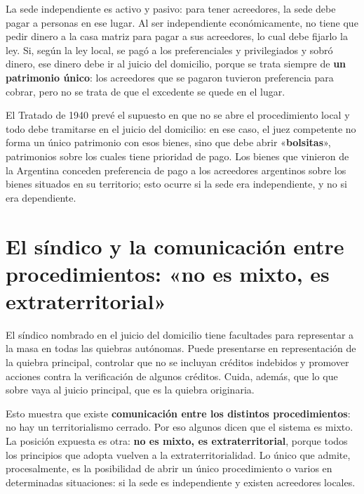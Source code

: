 \documentclass[12pt,oneside]{book}
\begin{document}
La sede independiente es activo y pasivo: para tener acreedores, la sede debe pagar a personas en ese lugar. Al ser independiente económicamente, no tiene que pedir dinero a la casa matriz para pagar a sus acreedores, lo cual debe fijarlo la ley. Si, según la ley local, se pagó a los preferenciales y privilegiados y sobró dinero, ese dinero debe ir al juicio del domicilio, porque se trata siempre de \textbf{un patrimonio único}: los acreedores que se pagaron tuvieron preferencia para cobrar, pero no se trata de que el excedente se quede en el lugar.

\begin{note}
El Tratado de 1940 prevé el supuesto en que no se abre el procedimiento local y todo debe tramitarse en el juicio del domicilio: en ese caso, el juez competente no forma un único patrimonio con esos bienes, sino que debe abrir «\textbf{bolsitas}», patrimonios sobre los cuales tiene prioridad de pago. Los bienes que vinieron de la Argentina conceden preferencia de pago a los acreedores argentinos sobre los bienes situados en su territorio; esto ocurre si la sede era independiente, y no si era dependiente.
\end{note}

\section{El síndico y la comunicación entre procedimientos: «no es mixto, es extraterritorial»}

El síndico nombrado en el juicio del domicilio tiene facultades para representar a la masa en todas las quiebras autónomas. Puede presentarse en representación de la quiebra principal, controlar que no se incluyan créditos indebidos y promover acciones contra la verificación de algunos créditos. Cuida, además, que lo que sobre vaya al juicio principal, que es la quiebra originaria.

Esto muestra que existe \textbf{comunicación entre los distintos procedimientos}: no hay un territorialismo cerrado. Por eso algunos dicen que el sistema es mixto. La posición expuesta es otra: \textbf{no es mixto, es extraterritorial}, porque todos los principios que adopta vuelven a la extraterritorialidad. Lo único que admite, procesalmente, es la posibilidad de abrir un único procedimiento o varios en determinadas situaciones: si la sede es independiente y existen acreedores locales.
\end{document}
